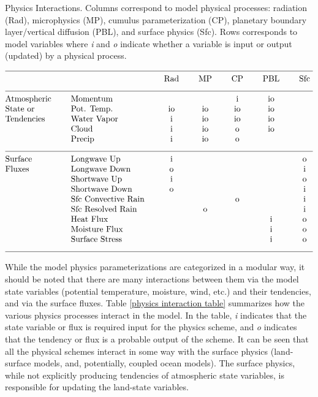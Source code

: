 \begin{table}
\caption{Physics Interactions. Columns correspond to 
model physical processes: radiation (Rad),
microphysics (MP), cumulus parameterization (CP), planetary boundary layer/vertical diffusion
(PBL), and surface physics (Sfc). Rows corresponds to
model variables where {\em i} and {\em o} indicate whether a variable is
input or output (updated) by a physical process.}
\label{physics interaction table}
$$\vbox
{\halign{#\hfil \qquad & #\hfil \qquad & \hfil#\hfil \qquad & \hfil#\hfil 
\qquad & \hfil#\hfil \qquad &  \hfil#\hfil \qquad & \hfil#\hfil \cr
\multispan7\hrulefill \cr
                &              & Rad       & MP           & CP           & PBL      &   Sfc   \cr
\multispan7\hrulefill \cr
Atmospheric     &  Momentum    &           &              &      i       &  io     &           \cr
State or        &  Pot. Temp.  &   io      &     io       &     io       &  io     &           \cr
Tendencies      &  Water Vapor &    i      &     io       &     io       &  io     &           \cr
                &  Cloud       &    i      &     io       &      o       &  io     &           \cr
                &  Precip      &    i      &     io       &      o       &         &           \cr
\multispan7\hrulefill \cr
Surface         &  Longwave Up &    i      &              &              &         &    o      \cr
Fluxes          &  Longwave Down &  o      &              &              &         &    i      \cr
                &  Shortwave Up &   i      &              &              &         &    o      \cr
                &  Shortwave Down & o      &              &              &         &    i      \cr
                &  Sfc Convective Rain &   &              &      o       &         &    i      \cr
                &  Sfc Resolved Rain &     &      o       &              &         &    i      \cr
                &  Heat Flux &             &              &              &   i     &    o      \cr
                &  Moisture Flux &         &              &              &   i     &    o      \cr
                &  Surface Stress &        &              &              &   i     &    o      \cr
\multispan7\hrulefill \cr
}}$$
\end{table}

While the model physics parameterizations are categorized in a modular way,
it should be noted that there are many interactions between them via the
model state variables (potential temperature, moisture, wind, etc.)
and their tendencies, and via the surface fluxes.
Table \ref {physics interaction table} summarizes how the various physics
processes interact in the model. In the table, {\em i} indicates that the 
state variable or flux is required input for the physics scheme, and {\em o}
indicates that the tendency or flux is a probable output of the scheme.
It can be seen that all the physical schemes interact in some way with the surface
physics (land-surface models, and, potentially, coupled ocean models).
The surface physics, while not explicitly producing tendencies of atmospheric
state variables, is responsible for updating the land-state variables.


